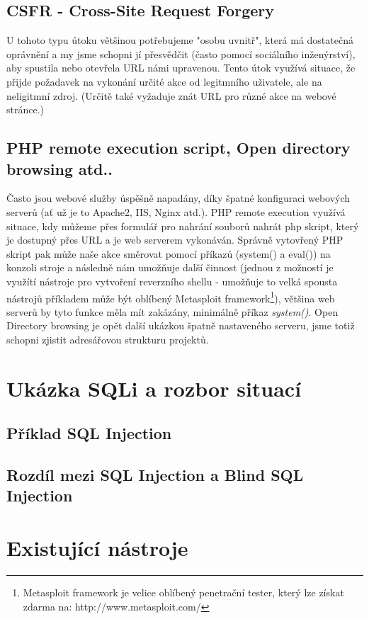 \documentclass[12pt, a4paper]{report}
\begin{document}
\section{CSFR - Cross-Site Request Forgery}
U tohoto typu útoku většinou potřebujeme "osobu uvnitř", která má dostatečná oprávnění a my jsme schopni jí přesvědčit (často pomocí sociálního inženýrství), aby spustila nebo otevřela URL námi upravenou. Tento útok využívá situace, že přijde požadavek na vykonání určité akce od legitmního uživatele, ale na neligitmní zdroj. (Určitě také vyžaduje znát URL pro různé akce na webové stránce.)
\section {PHP remote execution script, Open directory browsing atd..}
Často jsou webové služby úspěšně napadány, díky špatné konfiguraci webových serverů (ať už je to Apache2, IIS, Nginx atd.). PHP remote execution využívá situace, kdy můžeme přes formulář pro nahrání souborů nahrát php skript, který je dostupný přes URL a je web serverem vykonáván. Správně vytovřený PHP skript pak může naše akce směrovat pomocí příkazů (system() a eval()) na konzoli stroje a následně nám umožňuje další činnost (jednou z možností je využítí nástroje pro vytvoření reverzního shellu - umožňuje to velká spousta nástrojů příkladem může být oblíbený Metasploit framework\footnote{Metasploit framework je velice oblíbený penetrační tester, který lze získat zdarma na: http://www.metasploit.com/}), většina web serverů by tyto funkce měla mít zakázány, minimálně příkaz \emph{system()}. Open Directory browsing je opět další ukázkou špatně nastaveného serveru, jsme totiž schopni zjistit adresářovou strukturu projektů.
\chapter{Ukázka SQLi a rozbor situací}

\section{Příklad SQL Injection}

\section{Rozdíl mezi SQL Injection a Blind SQL Injection}

\chapter{Existující nástroje}
\end{document}
